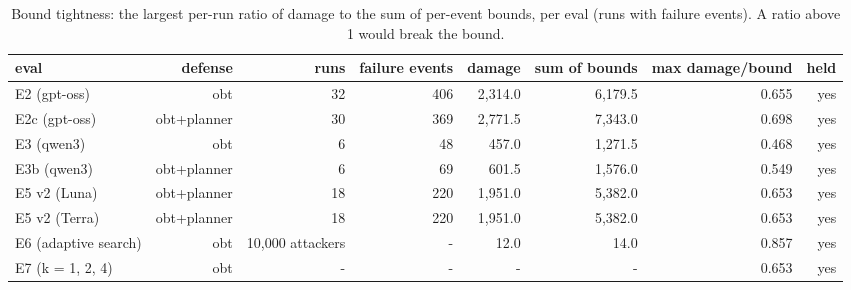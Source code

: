 \begin{table}[t]
\centering
\small
\caption{Bound tightness: the largest per-run ratio of damage to the sum of per-event bounds, per eval (runs with failure events). A ratio above 1 would break the bound.}
\label{tab:bound_tightness}
\begin{tabular}{lrrrrrrr}
\toprule
eval & defense & runs & failure events & damage & sum of bounds & max damage/bound & held \\
\midrule
E2 (gpt-oss) & obt & 32 & 406 & 2,314.0 & 6,179.5 & 0.655 & yes \\
E2c (gpt-oss) & obt+planner & 30 & 369 & 2,771.5 & 7,343.0 & 0.698 & yes \\
E3 (qwen3) & obt & 6 & 48 & 457.0 & 1,271.5 & 0.468 & yes \\
E3b (qwen3) & obt+planner & 6 & 69 & 601.5 & 1,576.0 & 0.549 & yes \\
E5 v2 (Luna) & obt+planner & 18 & 220 & 1,951.0 & 5,382.0 & 0.653 & yes \\
E5 v2 (Terra) & obt+planner & 18 & 220 & 1,951.0 & 5,382.0 & 0.653 & yes \\
E6 (adaptive search) & obt & 10,000 attackers & - & 12.0 & 14.0 & 0.857 & yes \\
E7 (k = 1, 2, 4) & obt & - & - & - & - & 0.653 & yes \\
\bottomrule
\end{tabular}
\end{table}
